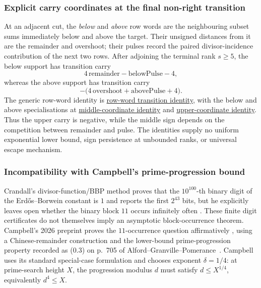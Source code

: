 \documentclass[11pt]{article}
\newcommand{\commit}{99f4bf47422abbd8757cbb22b50ba079d764d3a7}
\newcommand{\repobase}{https://github.com/wcook04/plectis-erdos/blob/\commit}
\newcommand{\PK}{Erdos249257}
\newcommand{\lword}[4]{\href{\repobase/\PK/#1\#L#2}{#4}}
\theoremstyle{definition}
\theoremstyle{remark}
\begin{document}
{\subsubsection{Explicit carry coordinates at the final non-right transition}
\label{res:producercarrycoordinates}

At an adjacent cut, the \emph{below} and \emph{above} row words are the
neighbouring subset sums immediately below and above the target.  Their
unsigned distances from it are the remainder and overshoot; their pulses
record the paired divisor-incidence contribution of the next two rows.
After adjoining the terminal rank \(s\ge5\), the below support has transition
carry
\[
  4\,\mathrm{remainder}-\mathrm{belowPulse}-4,
\]
whereas the above support has transition carry
\[
  -\bigl(4\,\mathrm{overshoot}+\mathrm{abovePulse}+4\bigr).
\]
The generic row-word identity is
\lword{HalfCylinderProducerLowerBound.lean}{105}{producerCarry_insert_seamWordSupport_eq}{row-word transition identity},
with the below and above specialisations at
\lword{HalfCylinderProducerLowerBound.lean}{150}{producerCarry_insert_seamBelowSupport_eq_middleCoordinate}{middle-coordinate identity}
and
\lword{HalfCylinderProducerLowerBound.lean}{183}{producerCarry_insert_seamAboveSupport_eq_neg_upperCoordinate}{upper-coordinate identity}.
Thus the upper carry is negative, while the middle sign depends on the
competition between remainder and pulse.  The identities supply no uniform
exponential lower bound, sign persistence at unbounded ranks, or universal
escape mechanism.

\subsubsection{Incompatibility with Campbell's prime-progression bound}
\label{res:campbellboundary}

Crandall's divisor-function/BBP method proves that the
\(10^{100}\)-th binary digit of the Erd\H{o}s--Borwein constant is \(1\)
and reports the first \(2^{43}\) bits, but he explicitly leaves open whether
the binary block \(11\) occurs infinitely often
\cite[\S\S5--7, open-PDF pp.~6--9]{crandall}.  These finite digit
certificates do not themselves imply an asymptotic block-occurrence theorem.
Campbell's 2026 preprint proves the \(11\)-occurrence question affirmatively
\cite[Theorem~1, p.~12; proof
pp.~12--24]{campbell}, using a Chinese-remainder
construction and the lower-bound prime-progression property recorded as
(0.3) on p.~705 of
Alford--Granville--Pomerance~\cite[p.~705, (0.3)]{alfordgranvillepomerance}.
Campbell uses its standard special-case formulation and chooses
exponent \(\delta=1/4\): at prime-search height \(X\), the progression
modulus \(d\) must satisfy \(d\le X^{1/4}\), equivalently \(d^4\le X\).

}
\end{document}
